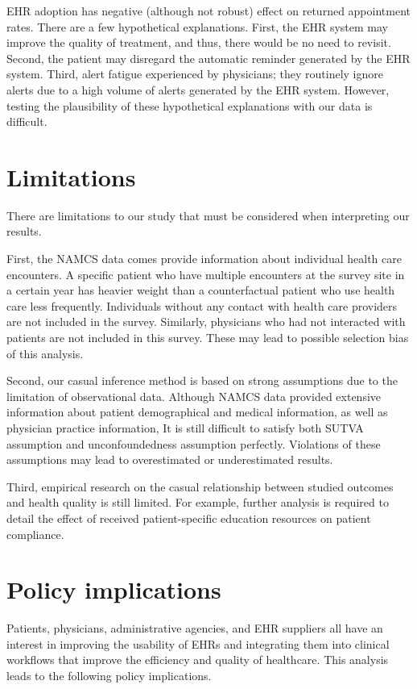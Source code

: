 \documentclass[12pt]{report}
\begin{document}
EHR adoption has negative (although not robust) effect on returned appointment rates. There are a few hypothetical explanations. First, the EHR system may improve the quality of treatment, and thus, there would be no need to revisit. Second, the patient may disregard the automatic reminder generated by the EHR system. Third, alert fatigue experienced by physicians; they routinely ignore alerts due to a high volume of alerts generated by the EHR system. However, testing the plausibility of these hypothetical explanations with our data is difficult.

\chapter{Limitations}
\label{chapter:limitations}
There are limitations to our study that must be considered when interpreting our results.

First, the NAMCS data comes provide information about individual health care encounters. A specific patient who have multiple encounters at the survey site in a certain year has heavier weight than a counterfactual patient who use health care less frequently. Individuals without any contact with health care providers are not included in the survey. Similarly, physicians who had not interacted with patients are not included in this survey. These may lead to possible selection bias of this analysis.

Second, our casual inference method is based on strong assumptions due to the limitation of observational data. Although NAMCS data provided extensive information about patient demographical and medical information, as well as physician practice information, It is still difficult to satisfy both SUTVA assumption and unconfoundedness assumption perfectly. Violations of these assumptions may lead to overestimated or underestimated results.

Third, empirical research on the casual relationship between studied outcomes and health quality is still limited. For example, further analysis is required to detail the effect of received patient-specific education resources on patient compliance.

\chapter{Policy implications}
\label{chapter:policyimplications}
Patients, physicians, administrative agencies, and EHR suppliers all have an interest in improving the usability of EHRs and integrating them into clinical workflows that improve the efficiency and quality of healthcare. This analysis leads to the following policy implications. 
\end{document}
